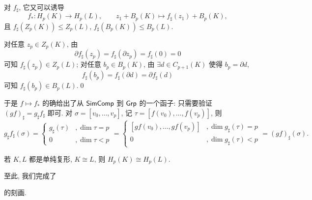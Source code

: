 	\begin{De-Pr}
		对 $ f_\sharp $, 它又可以诱导
		\[
			f_* : H_p(K)\to H_p(L),\qquad z_1+B_p(K)\mapsto f_\sharp(z_1)+B_p(K),
		\]
		且 $ f_\sharp(Z_p(K))\leqslant Z_p(L) $, $ f_\sharp(B_p(K))\leqslant B_p(L) $.
	\end{De-Pr}
	\begin{Proof}
		对任意 $ z_p\in Z_p(K) $, 由
		\[
			\partial f_\sharp(z_p)=f_\sharp(\partial z_p)=f_\sharp(0)=0
		\]
		可知 $ f_\sharp(z_p)\in Z_p(L) $; 对任意 $ b_p\in B_p(K) $, 由 $ \exists d\in C_{p+1}(K) $ 使得 $ b_p=\partial d $,
		\[
			f_\sharp(b_p)=f_\sharp(\partial d)=\partial f_\sharp(d)
		\]
		可知 $ f_\sharp(b_p)\in B_p(L) $.\qed
	\end{Proof}

	于是 $ f\mapsto f_* $ 的确给出了从 $ \mathsf{SimComp} $ 到 $ \mathsf{Grp} $ 的一个函子: 只需要验证 $ (gf)_\sharp=g_\sharp f_\sharp $ 即可. 对 $ \sigma=[v_0,\dots,v_p] $, 记 $ \tau=[f(v_0),\dots,f(v_p)] $, 则
	\[
		g_\sharp f_\sharp(\sigma)=\begin{cases}
			g_\sharp(\tau) &,\dim\tau=p \\ 0 &,\dim\tau<p
		\end{cases}=\begin{cases}
			[gf(v_0),\dots,gf(v_p)] &,\dim g_\sharp(\tau)=p\\ 0 &,\dim g_\sharp(\tau)<p
		\end{cases}=(gf)_\sharp(\sigma).
	\]
	
	\begin{Corollary}
		若 $ K,L $ 都是单纯复形, $ K\cong L $, 则 $ H_p(K)\cong H_p(L) $.
	\end{Corollary}
	
	至此, 我们完成了
	\begin{center}
	\end{center}
	的刻画.